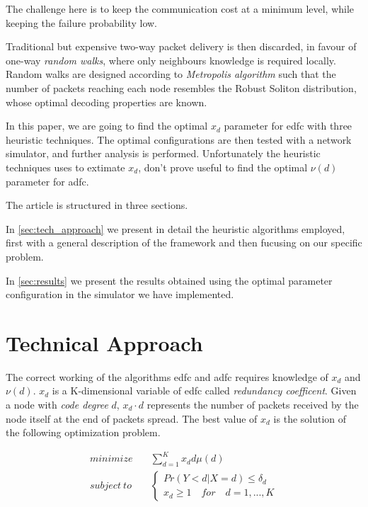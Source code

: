 \documentclass[journal]{IEEEtran}
\begin{document}
The challenge here is to keep the communication cost at a minimum level, while keeping the failure probability low.

Traditional but expensive two-way packet delivery is then discarded, in favour of one-way \emph{random walks}, where only neighbours knowledge is required locally.
Random walks are designed according to \emph{Metropolis algorithm} such that the number of packets reaching each node resembles the Robust Soliton distribution, whose optimal decoding properties are known\cite{Luby}.

In this paper, we are going to find the optimal $x_d$ parameter for \gls{edfc} with three heuristic techniques.
The optimal configurations are then tested with a network simulator, and further analysis is performed.
Unfortunately the heuristic techniques uses to extimate $x_d$, don't prove useful to find the optimal $\nu(d)$ parameter for \gls{adfc}.

The article is structured in three sections.

In \autoref{sec:tech_approach} we present in detail the heuristic algorithms employed, first with a general description of the framework and then fucusing on our specific problem.

In \autoref{sec:results} we present the results obtained using the optimal parameter configuration in the simulator we have implemented.

\section{Technical Approach}
\label{sec:tech_approach}

The correct working of the algorithms \gls{edfc} and \gls{adfc} requires knowledge of $x_d$ and $\nu(d)$. $x_d$ is a K-dimensional variable of \gls{edfc} called \textit{redundancy coefficent}. Given a node with \textit{code degree} $d$, $x_d \cdot d$ represents the number of packets received by the node itself at the end of packets spread. The best value of $x_d$ is the solution of the following optimization problem.

\begin{equation}
	\label{firstproblem}
	\begin{split}
		minimize & \quad \sum_{d=1}^K x_d d \mu (d) \\
		subject \ to & \quad \begin{cases}
			Pr(Y<d|X=d) \leq \delta_d \\
			x_d \geq 1 \quad for \quad d = 1,...,K
		\end{cases}
	\end{split}
\end{equation}
\end{document}
